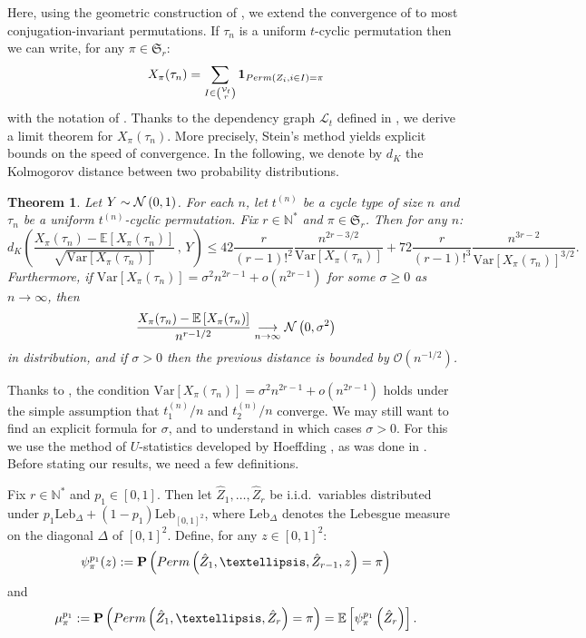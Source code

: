 \documentclass{article}
\newtheorem{theorem}{Theorem}[section]
\theoremstyle{remark}
\def\N{\mathbb{N}}
\def\m{\!-\!}
\newcommand{\cv}[2]{\underset{#1\to#2}{\longrightarrow}}
\def\O{\mathcal{O}}
\newcommand{\mean}[1]{\mathbb{E}\left[#1\right]}
\newcommand{\prob}[1]{\mathbf{P}\left(#1\right)}
\newcommand{\var}[1]{\mathrm{Var}\left[#1\right]}
\def\Leb{\mathrm{Leb}}
\newcommand{\One}[1]{\mathbf{1}_{#1}}
\newcommand{\Normal}[2]{{\cal N}\left(#1 , #2\right)}
\def\S{\mathfrak{S}}
\def\carre{[0,1]^2}
\newcommand{\perm}[1]{{\rm Perm}\left(#1\right)}
\def\L{\mathcal{L}}
\def\Vert{\mathcal{V}}
\begin{document}
Here, using the geometric construction of , we extend the convergence of  to most conjugation-invariant permutations.
If $\tau_n$ is a uniform $t$-cyclic permutation then we can write, for any $\pi\in\S_r$:
\begin{equation}\label{eq: write X as sum of partly dependent}
    X_\pi(\tau_n) = \sum_{I\in\binom{\Vert_t}{r}} \One{\perm{Z_i,i\in I} = \pi}
\end{equation}
with the notation of .
Thanks to the dependency graph $\L_t$ defined in , we derive a limit theorem for $X_\pi(\tau_n)$.
More precisely, Stein's method yields explicit bounds on the speed of convergence.
In the following, we denote by $d_K$ the Kolmogorov distance between two probability distributions.
\begin{theorem}\label{th: pattern Stein}
    Let $Y\sim\Normal{0}{1}$.
    For each $n$, let $t^{(n)}$ be a cycle type of size $n$ and $\tau_n$ be a uniform $t^{(n)}$-cyclic permutation.
    Fix $r\in\N^*$ and $\pi\in\S_r$.
    Then for any $n$:
    \begin{equation*}
        d_K\left(\frac{X_\pi(\tau_n)-\mean{X_\pi(\tau_n)}}{\sqrt{\var{X_\pi(\tau_n)}}} \,,\, Y\right)
        \le 42\frac{r}{(r\m1)!^2} \frac{n^{2r-3/2}}{\var{X_\pi(\tau_n)}}
        + 72\frac{r}{(r\m1)!^3} \frac{n^{3r-2}}{\var{X_\pi(\tau_n)}^{3/2}} .
    \end{equation*}
    Furthermore, if $\var{X_\pi(\tau_n)}=\sigma^2 n^{2r-1}+o(n^{2r-1})$ for some $\sigma\ge0$ as $n\to\infty$, then
    \begin{equation*}
        \frac{X_\pi(\tau_n)-\mean{X_\pi(\tau_n)}}{n^{r-1/2}}
        \cv{n}{\infty} \Normal{0}{\sigma^2}
    \end{equation*}
    in distribution, and if $\sigma>0$ then the previous distance is bounded by $\O(n^{-1/2})$.
\end{theorem}

Thanks to \cite[Proposition 7.2 and Theorem 8.14]{HR22}, the condition $\var{X_\pi(\tau_n)}=\sigma^2 n^{2r-1}+o(n^{2r-1})$ holds under the simple assumption that $t_1^{(n)}/n$ and $t_2^{(n)}/n$ converge.
We may still want to find an explicit formula for $\sigma$, and to understand in which cases $\sigma>0$.
For this we use the method of $U$-statistics developed by Hoeffding \cite{H48}, as was done in \cite{JNZ15}.
Before stating our results, we need a few definitions.

Fix $r\in\N^*$ and $p_1\in[0,1]$.
Then let $\hat Z_1,\dots,\hat Z_r$ be i.i.d.~variables distributed under $p_1\Leb_\Delta+(1\m p_1)\Leb_{\carre}$, where $\Leb_\Delta$ denotes the Lebesgue measure on the diagonal $\Delta$ of $\carre$.
Define, for any $z\in\carre$:
\begin{equation*}
    \psi_\pi^{p_1}(z) := \prob{ \perm{\hat Z_1,\dots,\hat Z_{r-1},z} = \pi }
\end{equation*}
and
\begin{equation*}
    \mu_\pi^{p_1} := \prob{ \perm{\hat Z_1,\dots,\hat Z_{r}} = \pi } = \mean{\psi_\pi^{p_1}\left(\hat Z_r\right)} .
\end{equation*}
\end{document}
